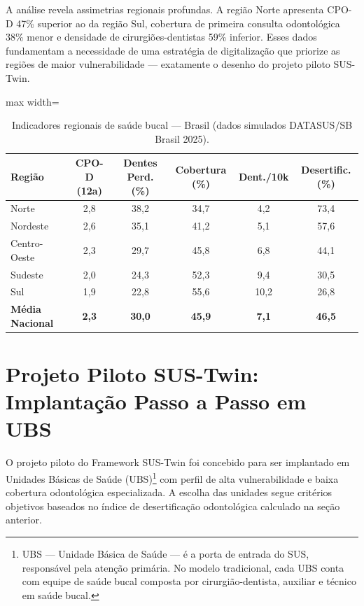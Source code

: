 A análise revela assimetrias regionais profundas. A região Norte
apresenta CPO-D 47\% superior ao da região Sul, cobertura de primeira
consulta odontológica 38\% menor e densidade de cirurgiões-dentistas
59\% inferior. Esses dados fundamentam a necessidade de uma estratégia
de digitalização que priorize as regiões de maior vulnerabilidade —
exatamente o desenho do projeto piloto SUS-Twin.

\begin{table}[htbp]
\centering
\caption{Indicadores regionais de saúde bucal — Brasil (dados simulados DATASUS/SB Brasil 2025).}
\label{tab:indicadores-regionais}
\begin{adjustbox}{max width=\textwidth}
\begin{tabular}{lccccc}
\toprule
\textbf{Região} & \textbf{CPO-D (12a)} & \textbf{Dentes Perd. (\%)} &
\textbf{Cobertura (\%)} & \textbf{Dent./10k} & \textbf{Desertific. (\%)} \\
\midrule
Norte           & 2,8 & 38,2 & 34,7 & 4,2 & 73,4 \\
Nordeste        & 2,6 & 35,1 & 41,2 & 5,1 & 57,6 \\
Centro-Oeste    & 2,3 & 29,7 & 45,8 & 6,8 & 44,1 \\
Sudeste         & 2,0 & 24,3 & 52,3 & 9,4 & 30,5 \\
Sul             & 1,9 & 22,8 & 55,6 & 10,2 & 26,8 \\
\midrule
\textbf{Média Nacional} & \textbf{2,3} & \textbf{30,0} & \textbf{45,9} &
\textbf{7,1} & \textbf{46,5} \\
\bottomrule
\end{tabular}
\end{adjustbox}
\end{table}

\section{Projeto Piloto SUS-Twin: Implantação Passo a Passo em UBS}
\label{sec:projeto-piloto}

O projeto piloto do Framework SUS-Twin foi concebido para ser
implantado em Unidades Básicas de Saúde (UBS)\footnote{UBS — Unidade
Básica de Saúde — é a porta de entrada do SUS, responsável pela atenção
primária. No modelo tradicional, cada UBS conta com equipe de saúde
bucal composta por cirurgião-dentista, auxiliar e técnico em saúde
bucal.} com perfil de alta vulnerabilidade e baixa cobertura
odontológica especializada. A escolha das unidades segue critérios
objetivos baseados no índice de desertificação odontológica calculado
na seção anterior.

